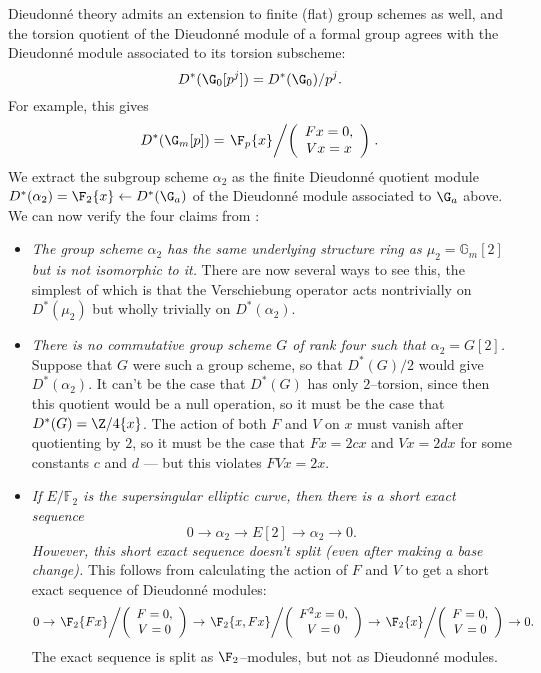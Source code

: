 \begin{example}\label{WorkedAlpha2Example}
Dieudonn\'e theory admits an extension to finite (flat) group schemes as well, and the torsion quotient of the Dieudonn\'e module of a formal group agrees with the Dieudonn\'e module associated to its torsion subscheme: \[D^*(\G_0[p^j]) = D^*(\G_0) / p^j.\]  For example, this gives \[D^*(\G_m[p]) = \left.\F_p\{x\} \middle/\left(\begin{array}{c} Fx = 0, \\ Vx = x \end{array}\right)\right. .\]  We extract the subgroup scheme $\alpha_2$ as the finite Dieudonn\'e quotient module $D^*(\alpha_2) = \F_2\{x\} \leftarrow D^*(\G_a)$ of the Dieudonn\'e module associated to $\G_a$ above.  We can now verify the four claims from :
\begin{itemize}
\item \textit{The group scheme $\alpha_2$ has the same underlying structure ring as $\mu_2 = \mathbb{G}_m[2]$ but is not isomorphic to it.}  There are now several ways to see this, the simplest of which is that the Verschiebung operator acts nontrivially on $D^*(\mu_2)$ but wholly trivially on $D^*(\alpha_2)$.
\item \textit{There is no commutative group scheme $G$ of rank four such that $\alpha_2 = G[2]$.}  Suppose that $G$ were such a group scheme, so that $D^*(G) / 2$ would give $D^*(\alpha_2)$.  It can't be the case that $D^*(G)$ has only $2$--torsion, since then this quotient would be a null operation, so it must be the case that $D^*(G) = \Z/4\{x\}$.  The action of both $F$ and $V$ on $x$ must vanish after quotienting by $2$, so it must be the case that $Fx = 2cx$ and $Vx = 2dx$ for some constants $c$ and $d$ --- but this violates $FVx = 2x$.
\item \textit{If $E/\mathbb{F}_2$ is the supersingular elliptic curve, then there is a short exact sequence \[0 \rightarrow \alpha_2 \rightarrow E[2] \rightarrow \alpha_2 \rightarrow 0.\]  However, this short exact sequence doesn't split (even after making a base change).}  This follows from calculating the action of $F$ and $V$ to get a short exact sequence of Dieudonn\'e modules: \[0 \to \left.\F_2\{Fx\}\middle / \left(\begin{array}{c} F = 0, \\ V = 0 \end{array}\right)\right. \to \left.\F_2\{x, Fx\} \middle/ \left( \begin{array}{c} F^2x = 0, \\ V = 0 \end{array}\right) \right. \to \left.\F_2\{x\}\middle / \left(\begin{array}{c} F = 0, \\ V = 0 \end{array}\right)\right. \to 0.\]  The exact sequence is split as $\F_2$--modules, but not as Dieudonn\'e modules.

\end{itemize}
\end{example}
